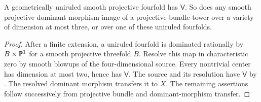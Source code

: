 \begin{corollary}\label{cor:uniruled}
A geometrically uniruled smooth projective fourfold has $\mathsf V$.
So does any smooth projective dominant morphism image of a
projective-bundle tower over a variety of dimension at most three,
or over one of these uniruled fourfolds.
\end{corollary}

\begin{proof}
After a finite extension, a uniruled fourfold is dominated rationally
by $B\times\mathbb P^1$ for a smooth projective threefold $B$. Resolve this
map in characteristic zero by smooth blowups of the four-dimensional
source. Every nontrivial center has dimension at most two, hence has
$\mathsf V$. The source and its resolution have $\mathsf V$ by
. The resolved dominant morphism transfers it
to $X$. The remaining assertions follow successively from projective
bundle and dominant-morphism transfer.
\end{proof}

